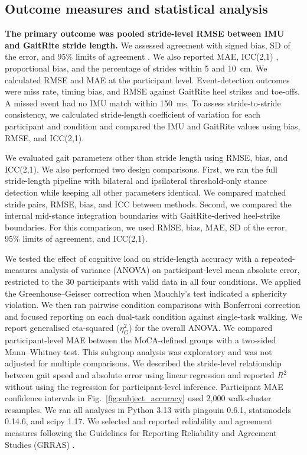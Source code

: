 \documentclass[fleqn,10pt,lineno]{wlpeerj}
\begin{document}
\subsection{Outcome measures and statistical analysis}\label{sec:outcomes}

\textbf{The primary outcome was pooled stride-level RMSE between IMU and GaitRite stride length.} We assessed agreement with signed bias, SD of the error, and 95\% limits of agreement \citep{Bland1986}. We also reported MAE, ICC(2,1) \citep{Shrout1979}, proportional bias, and the percentage of strides within 5 and 10~cm. We calculated RMSE and MAE at the participant level. Event-detection outcomes were miss rate, timing bias, and RMSE against GaitRite heel strikes and toe-offs. A missed event had no IMU match within 150~ms. To assess stride-to-stride consistency, we calculated stride-length coefficient of variation for each participant and condition and compared the IMU and GaitRite values using bias, RMSE, and ICC(2,1).

We evaluated gait parameters other than stride length using RMSE, bias, and ICC(2,1). We also performed two design comparisons. First, we ran the full stride-length pipeline with bilateral and ipsilateral threshold-only stance detection while keeping all other parameters identical. We compared matched stride pairs, RMSE, bias, and ICC between methods. Second, we compared the internal mid-stance integration boundaries with GaitRite-derived heel-strike boundaries. For this comparison, we used RMSE, bias, MAE, SD of the error, 95\% limits of agreement, and ICC(2,1).

We tested the effect of cognitive load on stride-length accuracy with a repeated-measures analysis of variance (ANOVA) on participant-level mean absolute error, restricted to the 30 participants with valid data in all four conditions. We applied the Greenhouse--Geisser correction when Mauchly's test indicated a sphericity violation. We then ran pairwise condition comparisons with Bonferroni correction and focused reporting on each dual-task condition against single-task walking. We report generalised eta-squared ($\eta^2_G$) for the overall ANOVA. We compared participant-level MAE between the MoCA-defined groups with a two-sided Mann--Whitney test. This subgroup analysis was exploratory and was not adjusted for multiple comparisons. We described the stride-level relationship between gait speed and absolute error using linear regression and reported $R^2$ without using the regression for participant-level inference. Participant MAE confidence intervals in Fig.~\ref{fig:subject_accuracy} used 2{,}000 walk-cluster resamples. We ran all analyses in Python 3.13 with pingouin 0.6.1, statsmodels 0.14.6, and scipy 1.17. We selected and reported reliability and agreement measures following the Guidelines for Reporting Reliability and Agreement Studies (GRRAS) \citep{Kottner2011}.
\end{document}
